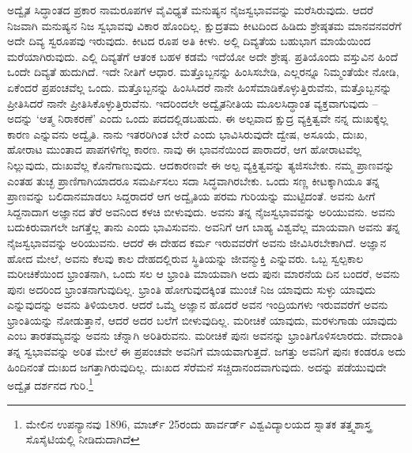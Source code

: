 ಅದ್ವೈತ ಸಿದ್ಧಾಂತದ ಪ್ರಕಾರ ನಾಮರೂಪಗಳ ವೈವಿಧ್ಯತೆ ಮನುಷ್ಯನ ನೈಜಸ್ವಭಾವವನ್ನು ಮರೆಸಿರುವುದು. ಆದರೆ ನಿಜವಾಗಿ ಮನುಷ್ಯನ ನಿಜ ಸ್ವಭಾವವು ವಿಕಾರ ಹೊಂದಿಲ್ಲ. ಕ್ಷುದ್ರತಮ ಕೀಟದಿಂದ ಹಿಡಿದು ಶ್ರೇಷ್ಠತಮ ಮಾನವನವರೆಗೆ ಅದೇ ದಿವ್ಯ ಸ್ವರೂಪವು ಇರುವುದು. ಕೀಟದ ರೂಪ ಅತಿ ಕೀಳು. ಅಲ್ಲಿ ದಿವ್ಯತೆಯ ಬಹುಭಾಗ ಮಾಯೆಯಿಂದ ಮರೆಯಾಗಿರುವುದು. ಎಲ್ಲಿ ದಿವ್ಯತೆಗೆ ಆತಂಕ ಬಹಳ ಕಡಮೆ ಇದೆಯೋ ಅದೇ ಶ್ರೇಷ್ಠ. ಪ್ರತಿಯೊಂದು ವಸ್ತುವಿನ ಹಿಂದೆ ಒಂದೇ ದಿವ್ಯತೆ ಹುದುಗಿದೆ. ಇದೇ ನೀತಿಗೆ ಆಧಾರ. ಮತ್ತೊಬ್ಬನನ್ನು ಹಿಂಸಿಸಬೇಡಿ, ಎಲ್ಲರನ್ನೂ ನಿಮ್ಮಂತೆಯೇ ನೋಡಿ, ಏಕೆಂದರೆ ಪ್ರಪಂಚವೆಲ್ಲ ಒಂದು. ಮತ್ತೊಬ್ಬನನ್ನು ಹಿಂಸಿಸಿದರೆ ನಾನೇ ಹಿಂಸೆಮಾಡಿಕೊಳ್ಳುತ್ತಿರುವೆನು, ಮತ್ತೊಬ್ಬನನ್ನು ಪ್ರೀತಿಸಿದರೆ ನಾನೇ ಪ್ರೀತಿಸಿಕೊಳ್ಳುತ್ತಿರುವೆನು. ಇದರಿಂದಲೇ ಅದ್ವೈತನೀತಿಯ ಮೂಲಸಿದ್ಧಾಂತ ವ್ಯಕ್ತವಾಗುವುದು – ಅದನ್ನು `ಆತ್ಮ ನಿರಾಕರಣೆ' ಎಂದು ಒಂದು ಪದದಲ್ಲಿಡಬಹುದು. ಈ ಅಲ್ಪವಾದ ಕ್ಷುದ್ರ ವ್ಯಕ್ತಿತ್ವವೇ ನನ್ನ ದುಃಖಕ್ಕೆಲ್ಲ ಕಾರಣ ಎನ್ನುವನು ಅದ್ವೈತಿ. ನಾನು ಇತರರಿಗಿಂತ ಬೇರೆ ಎಂದು ಭಾವಿಸಿರುವುದೇ ದ್ವೇಷ, ಅಸೂಯೆ, ದುಃಖ, ಹೋರಾಟ ಮುಂತಾದ ಪಾಪಗಳಿಗೆಲ್ಲ ಕಾರಣ. ನಾವು ಈ ಭಾವನೆಯಿಂದ ಪಾರಾದರೆ, ಆಗ ಹೋರಾಟವೆಲ್ಲ ನಿಲ್ಲುವುದು, ದುಃಖವೆಲ್ಲ ಕೊನೆಗಾಣುವುದು. ಆದಕಾರಣವೇ ಈ ಅಲ್ಪ ವ್ಯಕ್ತಿತ್ವವನ್ನು ತ್ಯಜಿಸಬೇಕು. ನಮ್ಮ ಪ್ರಾಣವನ್ನು ಎಂತಹ ತುಚ್ಛ ಪ್ರಾಣಿಗಾಗಿಯಾದರೂ ಸಮರ್ಪಿಸಲು ಸದಾ ಸಿದ್ಧವಾಗಿರಬೇಕು. ಒಂದು ಸಣ್ಣ ಕೀಟಕ್ಕಾಗಿಯೂ ತನ್ನ ಪ್ರಾಣವನ್ನು ಬಲಿದಾನಮಾಡಲು ಸಿದ್ದರಾದರೆ ಆಗ ಅದ್ವೈತಿಯ ಪರಮ ಗುರಿಯನ್ನು ಮುಟ್ಟಿದಂತೆ. ಅವನು ಹೀಗೆ ಸಿದ್ದನಾದಾಗ ಅಜ್ಞಾನದ ತೆರೆ ಅವನಿಂದ ಕಳಚಿ ಬೀಳುವುದು. ಅವನು ತನ್ನ ನೈಜಸ್ವಭಾವವನ್ನು ಅರಿಯುವನು. ಅವನು ಬದುಕಿರುವಾಗಲೇ ಜಗತ್ತೆಲ್ಲ ತಾನು ಎಂದು ಭಾವಿಸುವನು. ಅವನಿಗೆ ಆಗ ಬಾಹ್ಯ ವಿಶ್ವವೆಲ್ಲ ಮಾಯವಾಗಿ ಅವನು ತನ್ನ ನೈಜಸ್ವಭಾವವನ್ನು ಅರಿಯುವನು. ಆದರೆ ಈ ದೇಹದ ಕರ್ಮ ಇರುವವರೆಗೆ ಅವನು ಜೀವಿಸಿರಬೇಕಾಗಿದೆ. ಅಜ್ಞಾನ ಹೋದ ಮೇಲೆ, ಅವನು ಕೆಲವು ಕಾಲ ದೇಹದಲ್ಲಿರುವ ಸ್ಥಿತಿಯನ್ನು ಜೀವನ್ಮುಕ್ತಿ ಎನ್ನುವರು. ಒಬ್ಬ ಸ್ವಲ್ಪಕಾಲ ಮರೀಚಿಕೆಯಿಂದ ಭ್ರಾಂತನಾಗಿ, ಒಂದು ಸಲ ಆ ಭ್ರಾಂತಿ ಮಾಯವಾಗಿ ಅದು ಪುನಃ ಮಾರನೆಯ ದಿನ ಬಂದರೆ, ಅವನು ಪುನಃ ಅದರಿಂದ ಭ್ರಾಂತನಾಗುವುದಿಲ್ಲ. ಭ್ರಾಂತಿ ಹೋಗುವುದಕ್ಕಿಂತ ಮುಂಚೆ ನಿಜ ಯಾವುದು ಸುಳ್ಳು ಯಾವುದು ಎನ್ನುವುದನ್ನು ಅವನು ತಿಳಿಯಲಾರ. ಆದರೆ ಒಮ್ಮೆ ಅಜ್ಞಾನ ಹೊದರೆ ಅವನ ಇಂದ್ರಿಯಗಳು ಇರುವವರೆಗೆ ಅವನು ಭ್ರಾಂತಿಯನ್ನು ನೋಡುತ್ತಾನೆ, ಆದರೆ ಅದರ ಬಲೆಗೆ ಬೀಳುವುದಿಲ್ಲ. ಮರೀಚಿಕೆ ಯಾವುದು, ಮರಳುಗಾಡು ಯಾವುದು ಎಂಬ ತಾರತಮ್ಯವನ್ನು ಅವನು ಚೆನ್ನಾಗಿ ಅರಿತಿರುವನು. ಮರೀಚಿಕೆ ಪುನಃ ಅವನನ್ನು ಭ್ರಾಂತಿಗೊಳಿಸಲಾರದು. ವೇದಾಂತಿ ತನ್ನ ಸ್ವಭಾವವನ್ನು ಅರಿತ ಮೇಲೆ ಈ ಪ್ರಪಂಚವೇ ಅವನಿಗೆ ಮಾಯವಾಗುತ್ತದೆ. ಜಗತ್ತು ಅವನಿಗೆ ಪುನಃ ಕಂಡರೂ ಅದು ಹಿಂದಿನಂತೆ ದುಃಖದ ಜಗತ್ತಾಗಿರುವುದಿಲ್ಲ. ದುಃಖದ ಸೆರೆಮನೆ ಸಚ್ಚಿದಾನಂದವಾಗುವುದು. ಅದನ್ನು ಪಡೆಯುವುದೇ ಅದ್ವೈತ ದರ್ಶನದ ಗುರಿ.\footnote{ ಮೇಲಿನ ಉಪನ್ಯಾನವು 1896, ಮಾರ್ಚ್ 25ರಂದು ಹಾರ್ವರ್ಡ್ ವಿಶ್ವವಿದ್ಯಾಲಯದ ಸ್ನಾತಕ ತತ್ತ್ವಶಾಸ್ತ್ರ ಸೊಸೈಟಿಯಲ್ಲಿ ನೀಡಿದುದಾಗಿದೆ}

